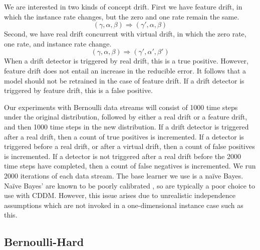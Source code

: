 We are interested in two kinds of concept drift. First we have feature drift, in which the instance rate changes, but the zero and one rate remain the same.
\begin{equation}
  (\gamma,\alpha,\beta) \Rightarrow (\gamma',\alpha,\beta)
\end{equation}
Second, we have real drift concurrent with virtual drift, in which the zero rate, one rate, and instance rate change.
\begin{equation}
  (\gamma,\alpha,\beta) \Rightarrow (\gamma',\alpha',\beta')
\end{equation}
When a drift detector is triggered by real drift, this is a true positive. However, feature drift does not entail an increase in the reducible error. It follows that a model should not be retrained in the case of feature drift. If a drift detector is triggered by feature drift, this is a false positive. 

Our experiments with Bernoulli data streams will consist of 1000 time steps under the original distribution, followed by either a real drift or a feature drift, and then 1000 time steps in the new distribution. If a drift detector is triggered after a real drift, then a count of true positives is incremented. If a detector is triggered before a real drift, or after a virtual drift, then a count of false positives is incremented. If a detector is not triggered after a real drift before the 2000 time steps have completed, then a count of false negatives is incremented. We run 2000 iterations of each data stream. The base learner we use is a na\"{i}ve Bayes. Na\"{i}ve Bayes' are known to be poorly calibrated \cite{calibrating}, so are typically a poor choice to use with CDDM. However, this issue arises due to unrealistic independence assumptions which are not invoked in a one-dimensional instance case such as this.

\subsection{Bernoulli-Hard}

